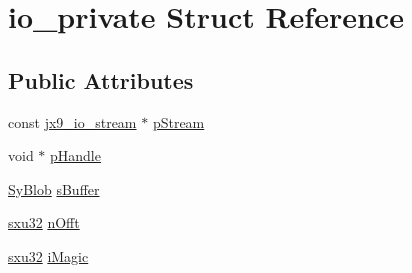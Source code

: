 \hypertarget{structio__private}{\section{io\-\_\-private Struct Reference}
\label{dd/d91/structio__private}
}
\subsection*{Public Attributes}
\begin{DoxyCompactItemize}
\item 
const \hyperlink{structjx9__io__stream}{jx9\-\_\-io\-\_\-stream} $\ast$ \hyperlink{structio__private_a2adc55c0db481478837c2dc76c62e65f}{p\-Stream}
\item 
void $\ast$ \hyperlink{structio__private_a135407c2360b7481b7e6a65eb02fd3f8}{p\-Handle}
\item 
\hyperlink{struct_sy_blob}{Sy\-Blob} \hyperlink{structio__private_a0f6cb2ecb35fd7a26c41b4f170ed9137}{s\-Buffer}
\item 
\hyperlink{unqlite_8c_abc5a8a3f345c200c98c485551f49666e}{sxu32} \hyperlink{structio__private_a72f4b562f689d80b79b57a4619aa1d2a}{n\-Offt}
\item 
\hyperlink{unqlite_8c_abc5a8a3f345c200c98c485551f49666e}{sxu32} \hyperlink{structio__private_ad010e0df353e4221a9ac0ead92dc3248}{i\-Magic}
\end{DoxyCompactItemize}


